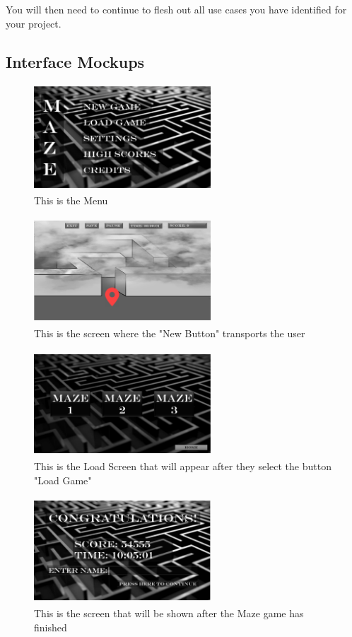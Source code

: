 \documentclass[10pt,conference,onecolumn,compsoc]{IEEEtran}
\begin{document}
You will then need to continue to flesh out all use cases you have identified for your project.

\subsection{Interface Mockups}

\begin{figure}[ht!]
\includegraphics[height=150px, width=250px]{Interface-Menu.png}
\caption{This is the Menu}
\label{Menu}
\end{figure}
\begin{figure}[ht!]
\includegraphics[height=150px, width=250px]{Interface-BeginMaze.png}
\caption{This is the screen where the "New Button" transports the user}
\label{Start of Maze}
\end{figure}
\begin{figure}[ht!]
\includegraphics[height=150px, width=250px]{Interface-Load.png}
\caption{This is the Load Screen that will appear after they select the button "Load Game"}
\label{Load Screen}
\end{figure}
\begin{figure}[ht!]
\includegraphics[height=150px, width=250px]{Interface-Finish.png}
\caption{This is the screen that will be shown after the Maze game has finished}
\label{Finish Screen}
\end{figure}
\end{document}
